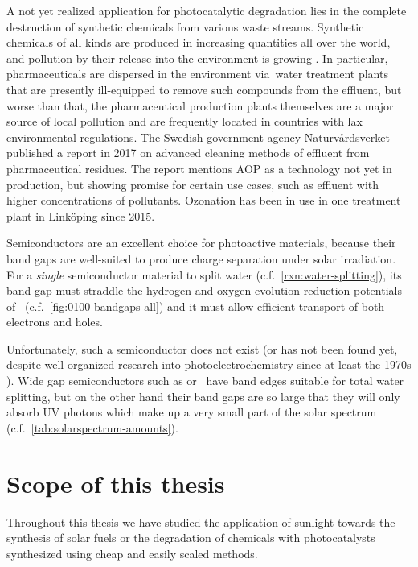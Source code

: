 \documentclass[draft,webedition,openright,titles,swedish,english]{LuaUUThesis}\usepackage[]{graphicx}\usepackage[]{xcolor}
\newcommand{\cf}{c.f.}
\newcommand{\via}{via}
\begin{document}
A not yet realized application for photocatalytic degradation lies
in the complete destruction of synthetic chemicals from various waste streams.
Synthetic chemicals of all kinds are produced in increasing quantities all over
the world, and pollution by their release into the environment is growing \cite{Bernhardt2017}.%
In particular, pharmaceuticals are dispersed in the environment \via\
water treatment plants that are presently ill-equipped to remove such compounds
from the effluent, but worse than that, the pharmaceutical production plants
themselves are a major source of local pollution and are
frequently located in countries with lax environmental regulations.
The Swedish government agency Naturvårdsverket published a report in 2017 \cite{Naturvardsverket2017}
on advanced cleaning methods of effluent from pharmaceutical residues.
The report mentions \gls{AOP} as a technology not yet in production, but showing
promise for certain use cases, such as effluent with higher concentrations of pollutants.
Ozonation has been in use in one treatment plant in Linköping since 2015.

Semiconductors are an excellent choice for photoactive materials, because their
band gaps are well-suited to produce charge separation under solar irradiation.
For a \emph{single} semiconductor material to split water (\cf\ \cref{rxn:water-splitting}),
its band gap must straddle the hydrogen and oxygen evolution reduction potentials
of \water\ (\cf\ \cref{fig:0100-bandgaps-all}) and it must allow efficient transport
of both electrons and holes.

Unfortunately, such a semiconductor does not exist (or has not been found yet, despite
well-organized research into photoelectrochemistry since at least the 1970s \cite{Maeda2011}).
Wide gap semiconductors such as \ch{TiO2} or \ZnO\ have band edges suitable
for total water splitting, but on the other hand their band gaps are so large
that they will only absorb \gls{UV} photons which make up a very small part
of the solar spectrum (\cf\ \cref{tab:solarspectrum-amounts}).



\section{Scope of this thesis}
\label{intro:scope-thesis}

Throughout this thesis we have studied the
application of sunlight towards the synthesis of solar fuels or
the degradation of chemicals
with photocatalysts synthesized using cheap and easily scaled methods.
\end{document}
